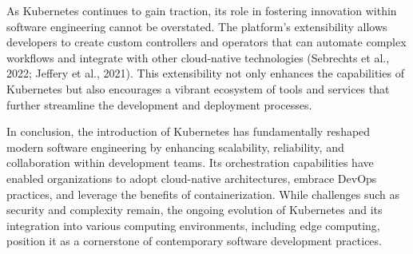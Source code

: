 As Kubernetes continues to gain traction, its role in fostering innovation within software engineering cannot be overstated. The platform's extensibility allows developers to create custom controllers and operators that can automate complex workflows and integrate with other cloud-native technologies (Sebrechts et al., 2022; Jeffery et al., 2021). This extensibility not only enhances the capabilities of Kubernetes but also encourages a vibrant ecosystem of tools and services that further streamline the development and deployment processes.

In conclusion, the introduction of Kubernetes has fundamentally reshaped modern software engineering by enhancing scalability, reliability, and collaboration within development teams. Its orchestration capabilities have enabled organizations to adopt cloud-native architectures, embrace DevOps practices, and leverage the benefits of containerization. While challenges such as security and complexity remain, the ongoing evolution of Kubernetes and its integration into various computing environments, including edge computing, position it as a cornerstone of contemporary software development practices.

